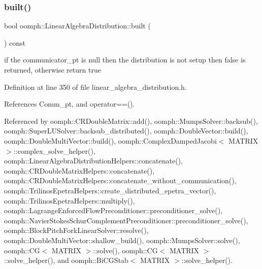 \subsubsection{\texorpdfstring{built()}{built()}}
{\footnotesize\ttfamily bool oomph\+::\+Linear\+Algebra\+Distribution\+::built (\begin{DoxyParamCaption}{ }\end{DoxyParamCaption}) const\hspace{0.3cm}{\ttfamily [inline]}}

if the communicator\+\_\+pt is null then the distribution is not setup then false is returned, otherwise return true 

Definition at line 350 of file linear\+\_\+algebra\+\_\+distribution.\+h.



References Comm\+\_\+pt, and operator==().



Referenced by oomph\+::\+C\+R\+Double\+Matrix\+::add(), oomph\+::\+Mumps\+Solver\+::backsub(), oomph\+::\+Super\+L\+U\+Solver\+::backsub\+\_\+distributed(), oomph\+::\+Double\+Vector\+::build(), oomph\+::\+Double\+Multi\+Vector\+::build(), oomph\+::\+Complex\+Damped\+Jacobi$<$ M\+A\+T\+R\+I\+X $>$\+::complex\+\_\+solve\+\_\+helper(), oomph\+::\+Linear\+Algebra\+Distribution\+Helpers\+::concatenate(), oomph\+::\+C\+R\+Double\+Matrix\+Helpers\+::concatenate(), oomph\+::\+C\+R\+Double\+Matrix\+Helpers\+::concatenate\+\_\+without\+\_\+communication(), oomph\+::\+Trilinos\+Epetra\+Helpers\+::create\+\_\+distributed\+\_\+epetra\+\_\+vector(), oomph\+::\+Trilinos\+Epetra\+Helpers\+::multiply(), oomph\+::\+Lagrange\+Enforced\+Flow\+Preconditioner\+::preconditioner\+\_\+solve(), oomph\+::\+Navier\+Stokes\+Schur\+Complement\+Preconditioner\+::preconditioner\+\_\+solve(), oomph\+::\+Block\+Pitch\+Fork\+Linear\+Solver\+::resolve(), oomph\+::\+Double\+Multi\+Vector\+::shallow\+\_\+build(), oomph\+::\+Mumps\+Solver\+::solve(), oomph\+::\+C\+G$<$ M\+A\+T\+R\+I\+X $>$\+::solve(), oomph\+::\+C\+G$<$ M\+A\+T\+R\+I\+X $>$\+::solve\+\_\+helper(), and oomph\+::\+Bi\+C\+G\+Stab$<$ M\+A\+T\+R\+I\+X $>$\+::solve\+\_\+helper().

\mbox{\label{classoomph_1_1LinearAlgebraDistribution_ac23e08b5c10d041a01bead478573a8ea}} 
